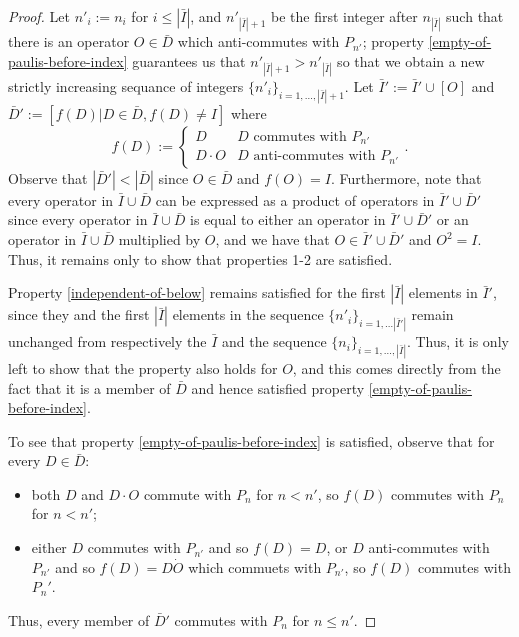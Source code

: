 \documentclass[twocolumn,showpacs,preprintnumbers,amsmath,amssymb,nofootinbib,pra,floatfix]{revtex4}
\newcommand{\lst}{\bar}
\begin{document}
\begin{proof}
Let $n'_i:=n_i$ for $i\le|\lst I|$, and $n'_{|\lst I|+1}$ be the first integer after $n_{|\lst I|}$ such that there is an operator $O\in\lst D$ which anti-commutes with $P_{n'}$;  property \ref{empty-of-paulis-before-index} guarantees us that $n'_{|\lst I|+1}>n'_{|\lst I|}$ so that we obtain a new strictly increasing sequance of integers $\{n'_i\}_{i=1,\dots,|\lst I|+1}$.  Let $\lst I':=\lst I'\cup [O]$ and $\lst D':=[f(D)|D\in \lst D, f(D)\ne I]$ where 
$$f(D):=
\begin{cases}
D & \text{$D$ commutes with $P_{n'}$} \\
D\cdot O & \text{$D$ anti-commutes with $P_{n'}$}
\end{cases}.$$  Observe that $|\lst D'|<|\lst D|$ since $O\in \lst D$ and $f(O)=I$.  Furthermore, note that every operator in $\lst I\cup \lst D$ can be expressed as a product of operators in $\lst I'\cup \lst D'$ since every operator in $\lst I\cup \lst D$ is equal to either an operator in $\lst I'\cup\lst D'$ or an operator in $\lst I\cup\lst D$ multiplied by $O$, and we have that $O\in \lst I'\cup \lst D'$ and $O^2=I$.  Thus, it remains only to show that properties 1-2 are satisfied.

Property \ref{independent-of-below} remains satisfied for the first $|\lst I|$ elements in $\lst I'$, since they and the first $|\lst I|$  elements in the sequence $\{n'_i\}_{i=1,\dots |\lst I'|}$ remain unchanged from respectively the $\lst I$ and the sequence $\{n_i\}_{i= 1,\dots,|\lst I|}$.  Thus, it is only left to show that the property also holds for $O$, and this comes directly from the fact that it is a member of $\lst D$ and hence satisfied property \ref{empty-of-paulis-before-index}.

To see that property \ref{empty-of-paulis-before-index} is satisfied, observe that for every $D\in \lst D$:
\begin{itemize}
\item both $D$ and $D\cdot O$ commute with $P_n$ for $n<n'$, so $f(D)$ commutes with $P_n$ for $n<n'$;
\item either $D$ commutes with $P_{n'}$ and so $f(D)=D$, or $D$ anti-commutes with $P_{n'}$ and so $f(D)=D\dot O$ which commuets with $P_{n'}$, so $f(D)$ commutes with $P_n'$.
\end{itemize} Thus, every member of $\lst D'$ commutes with $P_n$ for $n\le n'$.
\end{proof}
\end{document}
